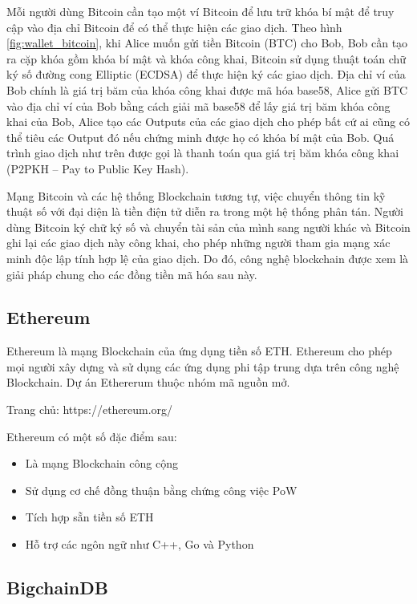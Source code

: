Mỗi người dùng Bitcoin cần tạo một ví Bitcoin để lưu trữ khóa bí mật để truy cập vào địa chỉ Bitcoin để có thể thực hiện các giao dịch. Theo hình \ref{fig:wallet_bitcoin}, khi Alice muốn gửi tiền Bitcoin (BTC) cho Bob, Bob cần tạo ra cặp khóa gồm khóa bí mật và khóa công khai, Bitcoin sử dụng thuật toán chữ ký số đường cong Elliptic (ECDSA) \cite{10.5555/1721909} để thực hiện ký các giao dịch. Địa chỉ ví của Bob chính là giá trị băm của khóa công khai được mã hóa base58, Alice gửi BTC vào địa chỉ ví của Bob bằng cách giải mã base58 để lấy giá trị băm khóa công khai của Bob, Alice tạo các Outputs của các giao dịch cho phép bất cứ ai cũng có thể tiêu các Output đó nếu chứng minh được họ có khóa bí mật của Bob. Quá trình giao dịch như trên được gọi là thanh toán qua giá trị băm khóa công khai (P2PKH – Pay to Public Key Hash).

Mạng Bitcoin và các hệ thống Blockchain tương tự, việc chuyển thông tin kỹ thuật số với đại diện là tiền điện tử diễn ra trong một hệ thống phân tán.
Người dùng Bitcoin ký chữ ký số và chuyển tài sản của mình sang người khác và Bitcoin ghi lại các giao dịch này công khai, cho phép những người tham gia mạng xác minh độc lập tính hợp lệ của giao dịch. 
Do đó, công nghệ blockchain được xem là giải pháp chung cho các đồng tiền mã hóa sau này.

\subsection{Ethereum}

Ethereum là mạng Blockchain của ứng dụng tiền số ETH. Ethereum cho phép mọi người xây dựng và sử dụng các ứng dụng phi tập trung dựa trên công nghệ Blockchain. Dự án Ethererum thuộc nhóm mã nguồn mở.

Trang chủ: https://ethereum.org/

Ethereum có một số đặc điểm sau:

\begin{itemize}
	\item Là mạng Blockchain công cộng
	\item Sử dụng cơ chế đồng thuận bằng chứng công việc PoW
	\item Tích hợp sẵn tiền số ETH
	\item Hỗ trợ các ngôn ngữ như C++, Go và Python
\end{itemize}


\subsection{BigchainDB}

